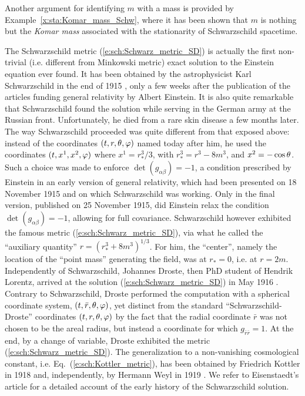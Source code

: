 Another argument for identifying $m$ with a mass is provided by
Example~\ref{x:sta:Komar_mass_Schw}, where
it has been shown that $m$ is nothing but the \emph{Komar mass} associated with the
stationarity of Schwarzschild spacetime.

\begin{hist} \label{h:sch:Schwarzschild_sol}
The Schwarzschild metric (\ref{e:sch:Schwarz_metric_SD}) is actually
the first non-trivial (i.e. different from Minkowski metric) exact solution
to the Einstein equation ever found. It has been obtained by the
astrophysicist Karl Schwarzschild in the end of 1915 \cite{Schwa1916}, only a few weeks
after the publication of the articles funding general relativity by
Albert Einstein. It is also quite remarkable that
Schwarzschild found the solution while serving in the German army at the Russian
front. Unfortunately, he died from a rare skin disease a few months later.
The way Schwarzschild proceeded was quite different from that exposed above:
instead of the coordinates $(t,r,\theta,\varphi)$
named today after him, he used the coordinates
$(t,x^1,x^2,\varphi)$ where $x^1 = r_*^3/3$, with $r_*^3 = r^3-8m^3$, and
$x^2 = -\cos\theta$. Such a choice was made to enforce $\det(g_{\alpha\beta}) = -1$, a condition
prescribed by Einstein in an early version of general relativity, which had been presented on
18 November 1915 and on which Schwarzschild was working. Only in the final version, published on
25 November 1915, did Einstein relax the condition $\det(g_{\alpha\beta}) = -1$, allowing for full
covariance. Schwarzschild however
exhibited the famous metric (\ref{e:sch:Schwarz_metric_SD}), via what he
called the ``auxiliary quantity'' $r = (r_*^3 + 8m^3)^{1/3}$.
For him, the ``center'',  namely the location of the ``point mass'' generating the field,
was at $r_* = 0$, i.e. at $r=2m$.
Independently of Schwarzschild, Johannes Droste, then PhD student of
Hendrik Lorentz,
arrived at the solution (\ref{e:sch:Schwarz_metric_SD}) in May 1916 \cite{Drost1917}.
Contrary to Schwarzschild, Droste performed the computation with
a spherical coordinate system, $(t,\bar r, \theta,\varphi)$, yet distinct from
the standard ``Schwarzschild-Droste'' coordinates $(t,r,\theta,\varphi)$ by the fact that the radial
coordinate $\bar r$ was not chosen to be the areal radius, but instead a
coordinate for which $g_{\bar r\bar r} = 1$. At the end, by a change of
variable, Droste exhibited the metric (\ref{e:sch:Schwarz_metric_SD}).
The generalization to a non-vanishing cosmological constant, i.e.
Eq.~(\ref{e:sch:Kottler_metric}), has been obtained by
Friedrich Kottler in 1918 \cite{Kottl1918} and, independently, by
Hermann Weyl in 1919 \cite{Weyl1919}. We refer to Eisenstaedt's article
\cite{Eisen82} for a detailed account of the early history of the
Schwarzschild solution.
\end{hist}


